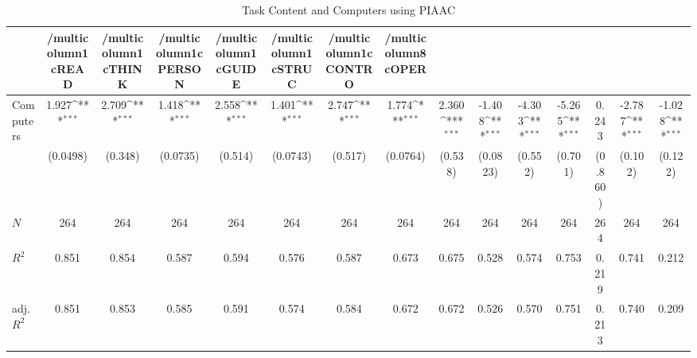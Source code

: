 \begin{table}[htbp]\centering
\def\sym#1{\ifmmode^{#1}\else\(^{#1}\)\fi}
\caption{Task Content and Computers using PIAAC}
\begin{tabular}{l*{14}{c}}
\hline\hline
            &/multicolumn{1}{c}{READ}&/multicolumn{1}{c}{THINK}&/multicolumn{1}{c}{PERSON}&/multicolumn{1}{c}{GUIDE}&/multicolumn{1}{c}{STRUC}&/multicolumn{1}{c}{CONTRO}&/multicolumn{8}{c}{OPER}                                                                                                                                                       \\
\hline
Computers   &       1.927\sym{***}&       2.709\sym{***}&       1.418\sym{***}&       2.558\sym{***}&       1.401\sym{***}&       2.747\sym{***}&       1.774\sym{***}&       2.360\sym{***}&      -1.408\sym{***}&      -4.303\sym{***}&      -5.265\sym{***}&       0.243         &      -2.787\sym{***}&      -1.028\sym{***}\\
            &    (0.0498)         &     (0.348)         &    (0.0735)         &     (0.514)         &    (0.0743)         &     (0.517)         &    (0.0764)         &     (0.538)         &    (0.0823)         &     (0.552)         &     (0.701)         &     (0.860)         &     (0.102)         &     (0.122)         \\
\hline
\(N\)       &         264         &         264         &         264         &         264         &         264         &         264         &         264         &         264         &         264         &         264         &         264         &         264         &         264         &         264         \\
\(R^{2}\)   &       0.851         &       0.854         &       0.587         &       0.594         &       0.576         &       0.587         &       0.673         &       0.675         &       0.528         &       0.574         &       0.753         &       0.219         &       0.741         &       0.212         \\
adj. \(R^{2}\)&       0.851         &       0.853         &       0.585         &       0.591         &       0.574         &       0.584         &       0.672         &       0.672         &       0.526         &       0.570         &       0.751         &       0.213         &       0.740         &       0.209         \\
\hline\hline
\end{tabular}
\end{table}
